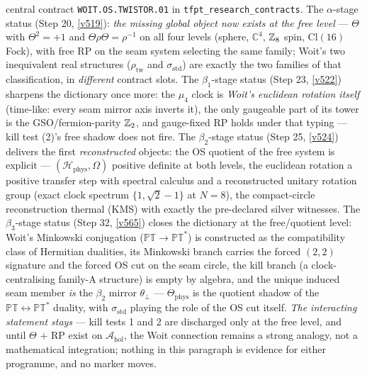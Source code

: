 central contract \texttt{WOIT.OS.TWISTOR.01} in \texttt{tfpt\_research\_contracts}. The
$\alpha$-stage status (Step 20, \vref{v519}): \emph{the missing global object now exists at the
free level} --- $\Theta$ with $\Theta^2=+1$ and $\Theta\rho\Theta=\rho^{-1}$ on all four levels
(sphere, $\mathbb C^4$, $\mathbb{Z}_8$ spin, $\mathrm{Cl}(16)$ Fock), with free RP on the seam system selecting
the same family; Woit's two inequivalent real structures ($\rho_{\mathrm{tw}}$ and
$\sigma_{\mathrm{std}}$) are exactly the two families of that classification, in \emph{different}
contract slots. The $\beta_1$-stage status (Step 23, \vref{v522}) sharpens the dictionary once
more: the $\mu_4$ clock is \emph{Woit's euclidean rotation itself} (time-like: every seam mirror
axis inverts it), the only gaugeable part of its tower is the GSO/fermion-parity $\mathbb{Z}_2$, and
gauge-fixed RP holds under that typing --- kill test (2)'s free shadow does not fire.
The $\beta_2$-stage status (Step 25, \vref{v524}) delivers the first \emph{reconstructed}
objects: the OS quotient of the free system is explicit ---
$(\mathcal H_{\mathrm{phys}}, \Omega)$ positive definite at both levels, the euclidean
rotation a positive transfer step with spectral calculus and a reconstructed unitary rotation
group (exact clock spectrum $\{1, \sqrt2-1\}$ at $N = 8$), the compact-circle reconstruction
thermal (KMS) with exactly the pre-declared silver witnesses.
The $\beta_3$-stage status (Step 32, \vref{v565}) closes the dictionary at the free/quotient
level: Woit's Minkowski conjugation ($\mathbb{PT}\to\mathbb{PT}^*$) is constructed as the
compatibility class of Hermitian dualities, its Minkowski branch carries the forced $(2,2)$
signature and the forced OS cut on the seam circle, the kill branch (a clock-centralising
family-A structure) is empty by algebra, and the unique induced seam member \emph{is} the
$\beta_2$ mirror $\theta_\perp$ --- $\Theta_{\mathrm{phys}}$ is the quotient shadow of the
$\mathbb{PT}\leftrightarrow\mathbb{PT}^*$ duality, with $\sigma_{\mathrm{std}}$ playing the
role of the OS cut itself.
\emph{The interacting statement stays \mO} --- kill tests 1 and 2 are discharged only at
the free level, and until $\Theta$ $+$ RP exist on $\mathcal A_{\mathrm{hol}}$, the Woit
connection remains a strong analogy, not a mathematical integration; nothing in this paragraph is
evidence for either programme, and no marker moves.

